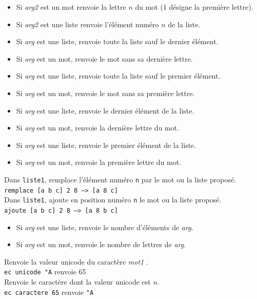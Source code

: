 \begin{itemize}
 \item  Si \textit{arg2} est un mot renvoie la lettre $n$ du mot (1 désigne la première lettre).
 \item  Si \textit{arg2} est une liste renvoie l'élément numéro $n$ de la liste.
\end{itemize}
\noindent
{}
\begin{itemize}
 \item  Si \textit{arg} est une liste, renvoie toute la liste sauf le dernier élément.
 \item Si \textit{arg} est un mot, renvoie le mot sans sa dernière lettre.
\end{itemize}
\noindent
{}
\begin{itemize}
 \item  Si \textit{arg} est une liste, renvoie toute la liste sauf le premier élément.
 \item Si \textit{arg} est un mot, renvoie le mot sans sa première lettre.
\end{itemize}
\noindent
{}
\begin{itemize}
 \item  Si \textit{arg} est une liste, renvoie le dernier élément de la liste.
 \item Si \textit{arg} est un mot, renvoie la dernière lettre du mot.
\end{itemize}
\noindent
{}
\begin{itemize}
 \item  Si \textit{arg} est une liste, renvoie le premier élément de la liste.
 \item Si \textit{arg} est un mot, renvoie la première lettre du mot.
\end{itemize}
\noindent
{}
Dans \texttt{liste1}, remplace l'élément numéro \texttt{n} par le mot ou la liste proposé.\\
\texttt{remplace [a b c] 2 8 ---> [a 8 c]}\\
Dans \texttt{liste1}, ajoute en position numéro \texttt{n} le mot ou la liste proposé.\\
\texttt{ajoute [a b c] 2 8 ---> [a 8 b c]}\\
\begin{itemize}
 \item  Si \textit{arg} est une liste, renvoie le nombre d'éléments de \textit{arg}.
 \item Si \textit{arg} est un mot, renvoie le nombre de lettres de \textit{arg}.
\end{itemize}
\noindent
{}
 Renvoie la valeur unicode du caractère \og \textit{mot1} \fg. \\
\texttt{ec unicode "A} renvoie 65\\
Renvoie le caractère dont la valeur unicode est $n$.\\
\texttt{ec caractere 65} renvoie \texttt{"A}\\
